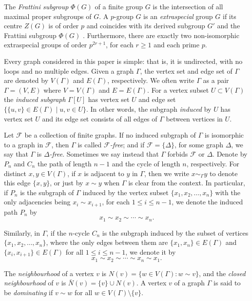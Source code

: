 \documentclass{elsarticle}
\begin{document}
The \emph{Frattini subgroup} $\Phi(G)$ of a finite group $G$ is the
intersection of all maximal proper subgroups of $G$. A $p$-group $G$
is an \emph{extraspecial} group $G$ if its centre $Z(G)$ is of order $p$
and coincides with its derived subgroup $G'$ and the Frattini subgroup
$\Phi(G)$ \cite[Chapter 4, pp.\ 123]{isaacs}. Furthermore, there are
exactly two non-isomorphic extraspecial groups of order $p^{2r+1}$,
for each $r\ge 1$ and each prime $p$.

Every graph considered in this paper is simple: that is, it is
undirected, with no loops and no multiple edges.  Given a graph
$\Gamma$, the vertex set and edge set of $\Gamma$ are denoted by
$V(\Gamma)$ and $E(\Gamma)$, respectively. We often write $\Gamma$ as
a pair $\Gamma=(V,E)$ where $V=V(\Gamma)$ and $E=E(\Gamma)$.  For a
vertex subset $U\subset V(\Gamma)$ the {\em induced subgraph}
$\Gamma[U]$ has vertex set $U$ and edge set
$\{\{u,v\}\in E(\Gamma)\mid u,v\in U\}$. In other words, the subgraph
\emph{induced} by $U$ has vertex set $U$ and its edge set consists of
all edges of $\Gamma$ between vertices in $U$.

Let $\mathcal{F}$ be a collection of finite graphs. If no induced
subgraph of $\Gamma$ is isomorphic to a graph in $\mathcal{F}$, then
$\Gamma$ is called {\em $\mathcal{F}$-free}; and if
$\mathcal{F}=\{\Delta\}$, for some graph $\Delta$, we say that
$\Gamma$ is \emph{$\Delta$-free}. Sometimes we say instead that
$\Gamma$ forbids $\mathcal{F}$ or $\Delta$.  Denote by $P_n$ and $C_n$
the path of length $n-1$ and the cycle of length $n$, respectively.
For distinct $x,y\in V(\Gamma)$, if $x$ is adjacent to $y$ in
$\Gamma$, then we write $x \sim_{\Gamma} y$ to denote this edge
$\{x,y\}$, or just by $x \sim y$ when $\Gamma$ is clear from the
context. In particular, if $P_n$ is the subgraph of $\Gamma$ induced
by the vertex subset $\{x_1,x_2,\ldots,x_n\}$ with the only
adjacencies being $x_i\sim x_{i+1}$, for each $1\le i\le n-1$, we denote
the induced path $P_n$ by
\[
x_1\sim x_2\sim\cdots \sim x_n.
\]

Similarly, in $\Gamma$, if the $n$-cycle
$C_n$ is the subgraph induced by the subset of vertices
$\{x_1,x_2,\ldots,x_n\}$, where the only edges between them are
$\{x_1,x_{n}\}\in E(\Gamma)$ and $\{x_i,x_{i+1}\}\in
E(\Gamma)$ for all $1\le i \le n-1$, we denote it by
\[
x_1\sim x_2\sim\cdots \sim x_n\sim x_1.
\]

The \emph{neighbourhood} of a vertex $v$ is $N(v)=\{w\in V(\Gamma):w\sim v\}$,
and the \emph{closed neighbourhood} of $v$ is $\bar N(v)=\{v\}\cup N(v)$.
A vertex $v$ of a graph $\Gamma$ is said to be \emph{dominating} if
$v\sim w$ for all $w\in V(\Gamma)\setminus\{v\}$.
\end{document}
